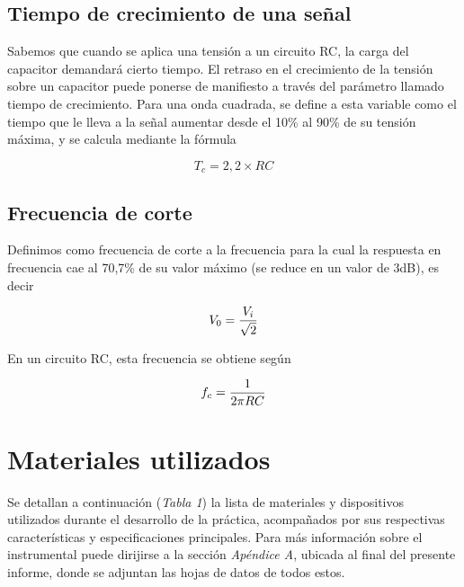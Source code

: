 \documentclass{article}
\begin{document}
\subsection{Tiempo de crecimiento de una señal}

	Sabemos que cuando se aplica una tensión a un circuito RC, la carga del capacitor demandará cierto tiempo. El retraso en el crecimiento de la tensión sobre un capacitor puede ponerse de manifiesto a través del parámetro llamado tiempo de crecimiento. Para una onda cuadrada, se define a esta variable como el tiempo que le lleva a la señal aumentar desde el 10\% al 90\% de su tensión máxima, y se calcula mediante la fórmula

\begin{equation*}
	T_c = 2,2 \times RC
\end{equation*}
\smallskip


\subsection{Frecuencia de corte}

Definimos como frecuencia de corte a la frecuencia para la cual la respuesta en frecuencia cae al 70,7\% de su valor máximo (se reduce en un valor de 3dB), es decir
\medskip

\begin{equation*}
	V_0 = {V_i \over \sqrt{2}}
\end{equation*}
\bigskip

\noindent En un circuito RC, esta frecuencia se obtiene según
\medskip

\begin{equation*}
	f_c = {1 \over 2 \pi RC}
\end{equation*}
\medskip

\bigskip\bigskip




\section{Materiales utilizados}

	Se detallan a continuación (\textit{Tabla 1}) la lista de materiales y dispositivos utilizados durante el desarrollo de la práctica, acompañados por sus respectivas características y especificaciones principales. Para más información sobre el instrumental puede dirijirse a la sección \textit{Apéndice A}, ubicada al final del presente informe, donde se adjuntan las hojas de datos de todos estos.
\bigskip\bigskip
\end{document}
